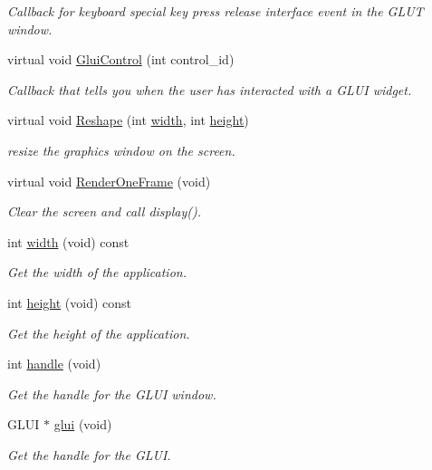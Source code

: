 \begin{DoxyCompactItemize}
\begin{DoxyCompactList}\small\item\em Callback for keyboard special key press release interface event in the G\+L\+UT window. \end{DoxyCompactList}\item 
virtual void \hyperlink{classimage__tools_1_1BaseGfxApp_a62fbfbb3b1f3e9d476e82c8e7640e78e}{Glui\+Control} (int control\+\_\+id)\hypertarget{classimage__tools_1_1BaseGfxApp_a62fbfbb3b1f3e9d476e82c8e7640e78e}{}\label{classimage__tools_1_1BaseGfxApp_a62fbfbb3b1f3e9d476e82c8e7640e78e}

\begin{DoxyCompactList}\small\item\em Callback that tells you when the user has interacted with a G\+L\+UI widget. \end{DoxyCompactList}\item 
virtual void \hyperlink{classimage__tools_1_1BaseGfxApp_a082984712d240d055abe10d9d9ba5297}{Reshape} (int \hyperlink{classimage__tools_1_1BaseGfxApp_a2fe403c5392f624477c2ce4429f1a7b5}{width}, int \hyperlink{classimage__tools_1_1BaseGfxApp_aa961e13a7a8e6062204223cc33ac7503}{height})
\begin{DoxyCompactList}\small\item\em resize the graphics window on the screen. \end{DoxyCompactList}\item 
virtual void \hyperlink{classimage__tools_1_1BaseGfxApp_ae4dd5d263aa016d5e767a90c4e102e49}{Render\+One\+Frame} (void)
\begin{DoxyCompactList}\small\item\em Clear the screen and call display(). \end{DoxyCompactList}\item 
int \hyperlink{classimage__tools_1_1BaseGfxApp_a2fe403c5392f624477c2ce4429f1a7b5}{width} (void) const 
\begin{DoxyCompactList}\small\item\em Get the width of the application. \end{DoxyCompactList}\item 
int \hyperlink{classimage__tools_1_1BaseGfxApp_aa961e13a7a8e6062204223cc33ac7503}{height} (void) const 
\begin{DoxyCompactList}\small\item\em Get the height of the application. \end{DoxyCompactList}\item 
int \hyperlink{classimage__tools_1_1BaseGfxApp_a18d458232b04b17d522996101ee0945f}{handle} (void)
\begin{DoxyCompactList}\small\item\em Get the handle for the G\+L\+UI window. \end{DoxyCompactList}\item 
G\+L\+UI $\ast$ \hyperlink{classimage__tools_1_1BaseGfxApp_a780a6702441c4d8c821fb40ede140c71}{glui} (void)
\begin{DoxyCompactList}\small\item\em Get the handle for the G\+L\+UI. \end{DoxyCompactList}\end{DoxyCompactItemize}
